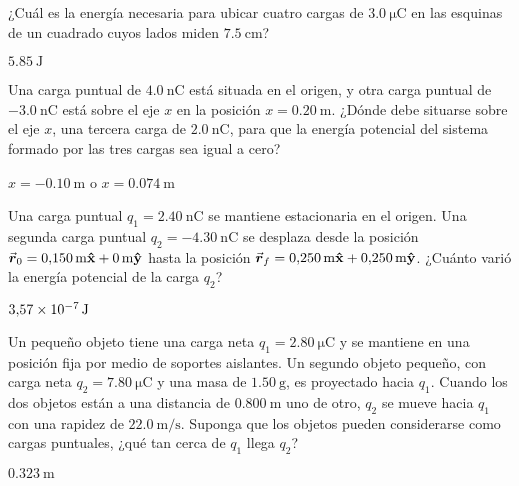 \setcounter{figure}{0}
%
\begin{Exercise}
  ¿Cuál es la energía necesaria para ubicar cuatro cargas de $\SI{3.0}{\micro\coulomb}$ en las esquinas de un cuadrado cuyos lados miden $\SI{7.5}{\centi\metre}$?
\end{Exercise}
\begin{Answer}
  $\SI{5.85}{\joule}$
\end{Answer}
%
\begin{Exercise}
  Una carga puntual de $\SI{4.0}{\nano\coulomb}$ está situada en el origen, y otra carga puntual de $\SI{-3.0}{\nano\coulomb}$ está sobre el eje $x$ en la posición $x = \SI{0.20}{\metre}$. ¿Dónde debe situarse sobre el eje $x$, una tercera carga de $\SI{2.0}{\nano\coulomb}$, para que la energía potencial del sistema formado por las tres cargas sea igual a cero?
\end{Exercise}
\begin{Answer}
	\begin{minipage}[t]{.4\textwidth}
    $x = \SI{-0.10}{\metre}$ o $x = \SI{0.074}{\metre}$
  \end{minipage}
\end{Answer}
%
\begin{Exercise}
  Una carga puntual $q_1 = \SI{2.40}{\nano\coulomb}$ se mantiene estacionaria en el origen. Una segunda carga puntual $q_2 = \SI{-4.30}{\nano\coulomb}$ se desplaza desde la posición $\va*{r}_0 =\SI{0.150}{\metre}\vu{x} + \SI{0}{\metre}\vu{y}$ hasta la posición $\va*{r}_f =\SI{0.250}{\metre}\vu{x} + \SI{0.250}{\metre}\vu{y}$. ¿Cuánto varió la energía potencial de la carga $q_2$?
\end{Exercise}
\begin{Answer}
  $\SI{3.57E-7}{\joule}$
\end{Answer}
%
\begin{Exercise}
  Un pequeño objeto tiene una carga neta $q_1 = \SI{2.80}{\micro\coulomb}$ y se mantiene en una posición fija por medio de soportes aislantes. Un segundo objeto pequeño, con carga neta $q_2 = \SI{7.80}{\micro\coulomb}$ y una masa de $\SI{1.50}{\gram}$, es proyectado hacia $q_1$. Cuando los dos objetos están a una distancia de $\SI{0.800}{\metre}$ uno de otro, $q_2$ se mueve hacia $q_1$ con una rapidez de $\SI{22.0}{\metre/\second}$. Suponga que los objetos pueden considerarse como cargas puntuales, ¿qué tan cerca de $q_1$ llega $q_2$?
\end{Exercise}
\begin{Answer}
  $\SI{0.323}{\metre}$
\end{Answer}
